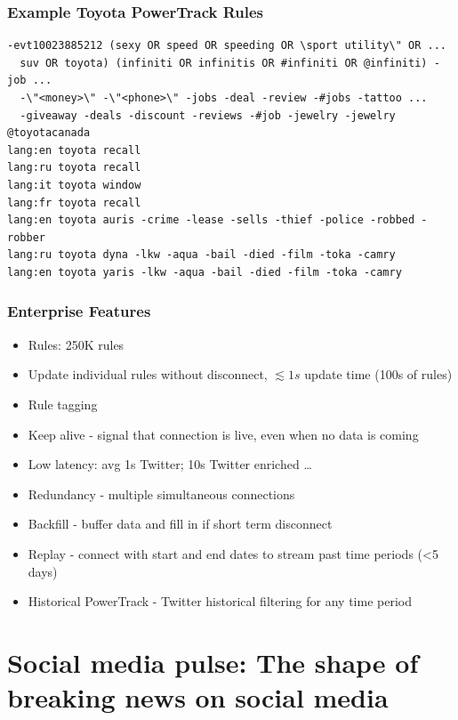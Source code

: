 \documentclass{beamer}
\begin{document}

\begin{frame}[fragile]\frametitle{Example Toyota PowerTrack Rules}
\begin{verbatim}
-evt10023885212 (sexy OR speed OR speeding OR \sport utility\" OR ...
  suv OR toyota) (infiniti OR infinitis OR #infiniti OR @infiniti) -job ...
  -\"<money>\" -\"<phone>\" -jobs -deal -review -#jobs -tattoo ...
  -giveaway -deals -discount -reviews -#job -jewelry -jewelry
@toyotacanada
lang:en toyota recall
lang:ru toyota recall
lang:it toyota window
lang:fr toyota recall
lang:en toyota auris -crime -lease -sells -thief -police -robbed -robber
lang:ru toyota dyna -lkw -aqua -bail -died -film -toka -camry
lang:en toyota yaris -lkw -aqua -bail -died -film -toka -camry
\end{verbatim}
\end{frame}

\begin{frame}\frametitle{Enterprise Features}
\begin{center}
\begin{itemize}
\item Rules: 250K rules
\item Update individual rules without disconnect, $\lesssim1s$ update time (100s of rules)
\item Rule tagging
\item Keep alive - signal that connection is live, even when no data is coming
\item Low latency: avg 1s Twitter; 10s Twitter enriched \ldots
\item Redundancy - multiple simultaneous connections
\item Backfill - buffer data and fill in if short term disconnect
\item Replay - connect with start and end dates to stream past time periods (<5 days)
\item Historical PowerTrack - Twitter historical filtering for any time period
\end{itemize}
\end{center}
\end{frame}

%
%

\section{Social media pulse: The shape of breaking news on social media}
\begin{frame}
\begin{center}
{\Huge \insertsection }
\end{center}
\end{frame}
\end{document}
